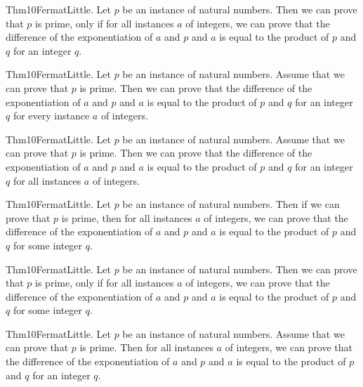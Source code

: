 \documentclass{article}
\begin{document}
Thm10FermatLittle. Let $p$ be an instance of natural numbers. Then we can prove that $p$ is prime, only if for all instances $a$ of integers, we can prove that the difference of the exponentiation of $a$ and $p$ and $a$ is equal to the product of $p$ and $q$ for an integer $q$.

Thm10FermatLittle. Let $p$ be an instance of natural numbers. Assume that we can prove that $p$ is prime. Then we can prove that the difference of the exponentiation of $a$ and $p$ and $a$ is equal to the product of $p$ and $q$ for an integer $q$ for every instance $a$ of integers.

Thm10FermatLittle. Let $p$ be an instance of natural numbers. Assume that we can prove that $p$ is prime. Then we can prove that the difference of the exponentiation of $a$ and $p$ and $a$ is equal to the product of $p$ and $q$ for an integer $q$ for all instances $a$ of integers.

Thm10FermatLittle. Let $p$ be an instance of natural numbers. Then if we can prove that $p$ is prime, then for all instances $a$ of integers, we can prove that the difference of the exponentiation of $a$ and $p$ and $a$ is equal to the product of $p$ and $q$ for some integer $q$.

Thm10FermatLittle. Let $p$ be an instance of natural numbers. Then we can prove that $p$ is prime, only if for all instances $a$ of integers, we can prove that the difference of the exponentiation of $a$ and $p$ and $a$ is equal to the product of $p$ and $q$ for some integer $q$.

Thm10FermatLittle. Let $p$ be an instance of natural numbers. Assume that we can prove that $p$ is prime. Then for all instances $a$ of integers, we can prove that the difference of the exponentiation of $a$ and $p$ and $a$ is equal to the product of $p$ and $q$ for an integer $q$.
\end{document}
